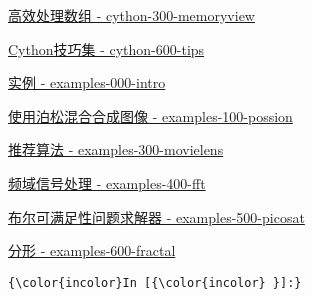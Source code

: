 \documentclass[11pt]{article}
\begin{document}
\href{10-cython/cython-300-memoryview.ipynb}{高效处理数组 -
cython-300-memoryview}

\href{10-cython/cython-600-tips.ipynb}{Cython技巧集 - cython-600-tips}

\href{11-examples/examples-000-intro.ipynb}{实例 - examples-000-intro}

\href{11-examples/examples-100-possion.ipynb}{使用泊松混合合成图像 -
examples-100-possion}

\href{11-examples/examples-300-movielens.ipynb}{推荐算法 -
examples-300-movielens}

\href{11-examples/examples-400-fft.ipynb}{频域信号处理 -
examples-400-fft}

\href{11-examples/examples-500-picosat.ipynb}{布尔可满足性问题求解器 -
examples-500-picosat}

\href{11-examples/examples-600-fractal.ipynb}{分形 -
examples-600-fractal}

    
    \begin{Verbatim}[commandchars=\\\{\}]
{\color{incolor}In [{\color{incolor} }]:} 
\end{Verbatim}



    
    
    
    
\end{document}
